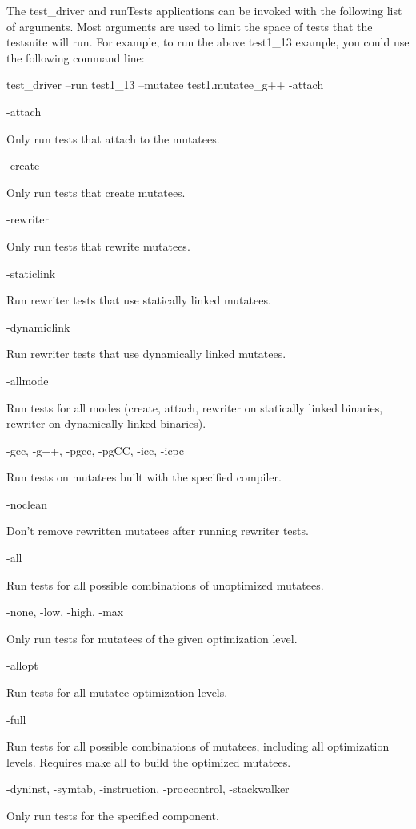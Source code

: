 {{{
The test_driver and runTests applications can be invoked with the following list of arguments. Most arguments are
used to limit the space of tests that the testsuite will run. For example, to run the above test1_13 example, you
could use the following command line:}

{
test_driver –run test1_13 –mutatee test1.mutatee_g++ -attach}


\bigskip

{
{}-attach

{
Only run tests that attach to the mutatees.}

{
{}-create}

{
Only run tests that create mutatees.}

{
{}-rewriter}

{
Only run tests that rewrite mutatees.}

{
{}-staticlink}

{
Run rewriter tests that use statically linked mutatees.}

{
{}-dynamiclink}

{
Run rewriter tests that use dynamically linked mutatees.}

{
{}-allmode}

{
Run tests for all modes (create, attach, rewriter on statically linked binaries, rewriter on dynamically linked
binaries).}

{
{}-gcc, -g++, -pgcc, -pgCC, -icc, -icpc}

{
Run tests on mutatees built with the specified compiler.}

{
{}-noclean}

{
Don't remove rewritten mutatees after running rewriter tests.}

{
{}-all}

{
Run tests for all possible combinations of unoptimized mutatees.}

{
{}-none, -low, -high, -max}

{
Only run tests for mutatees of the given optimization level.}

{
{}-allopt}

{
Run tests for all mutatee optimization levels.}

{
{}-full}

{
Run tests for all possible combinations of mutatees, including all optimization levels. Requires make all to build the
optimized mutatees.}

{
{}-dyninst, -symtab, -instruction, -proccontrol, -stackwalker}

{
Only run tests for the specified component.}

}}}
